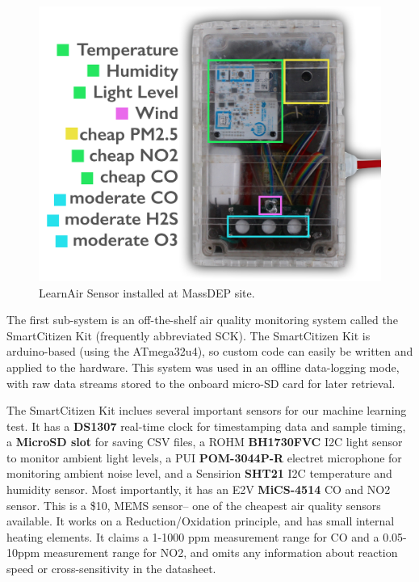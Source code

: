 \begin{figure}[htb]
 	\includegraphics[width=\textwidth]{visuals/learnairV1_labeled}               
 	 \caption{LearnAir Sensor installed at MassDEP site.}
  	\label{fig:learnairv1_labeled}
\end{figure}

The first sub-system is an off-the-shelf air quality monitoring system called the SmartCitizen Kit (frequently abbreviated SCK).  The SmartCitizen Kit is arduino-based (using the ATmega32u4), so custom code can easily be written and applied to the hardware.  This system was used in an offline data-logging mode, with raw data streams stored to the onboard micro-SD card for later retrieval.  

The SmartCitizen Kit inclues several important sensors for our machine learning test.  It has a \textbf{DS1307} real-time clock for timestamping data and sample timing, a \textbf{MicroSD slot} for saving CSV files, a ROHM \textbf{BH1730FVC} I2C light sensor to monitor ambient light levels, a PUI \textbf{POM-3044P-R} electret microphone for monitoring ambient noise level, and a Sensirion \textbf{SHT21} I2C temperature and humidity sensor.  Most importantly, it has an E2V \textbf{MiCS-4514} CO and NO2 sensor.  This is a \$10, MEMS sensor-- one of the cheapest air quality sensors available.  It works on a Reduction/Oxidation principle, and has small internal heating elements.  It claims a 1-1000 ppm measurement range for CO and a 0.05-10ppm measurement range for NO2, and omits any information about reaction speed or cross-sensitivity in the datasheet.


